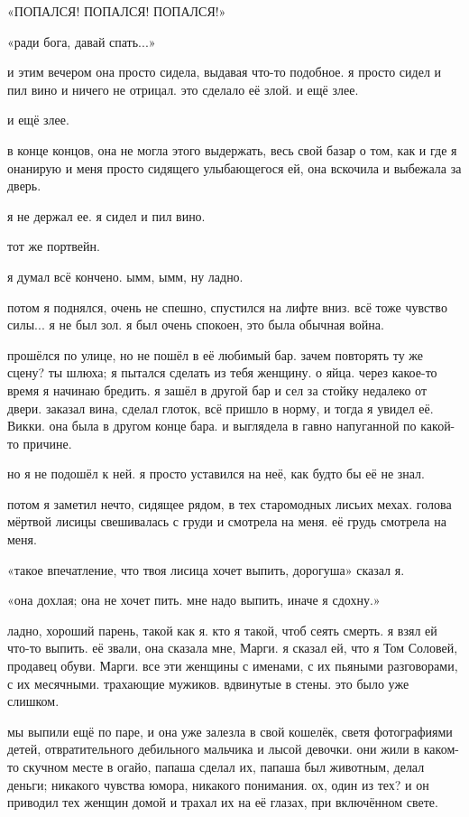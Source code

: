 «ПОПАЛСЯ! ПОПАЛСЯ! ПОПАЛСЯ!»

«ради бога, давай спать...»

и этим вечером она просто сидела, выдавая что-то подобное.
я просто сидел и
пил вино и ничего не отрицал.
это сделало её злой.
и ещё злее.

и ещё злее.

в конце концов, она не могла этого выдержать, весь свой базар о том, как и 
где я онанирую и меня просто сидящего улыбающегося ей, она вскочила и 
выбежала за дверь.

я не держал ее.
я сидел и пил вино.

тот же портвейн.

я думал всё кончено.
ымм, ымм, ну ладно.

потом я поднялся, очень не спешно, спустился на лифте вниз.
всё тоже чувство силы...
я не был зол.
я был очень спокоен, это была обычная война.

прошёлся по улице, но не пошёл в её любимый бар.
зачем повторять ту же 
сцену? ты шлюха; я пытался сделать из тебя женщину.
о яйца.
через какое-то
время я начинаю бредить.
я зашёл в другой бар и сел за стойку недалеко от 
двери.
заказал вина, сделал глоток, всё пришло в норму, и тогда я увидел её.
Викки.
она была в другом конце бара.
и выглядела в гавно напуганной по какой-то причине.

но я не подошёл к ней.
я просто уставился на неё, как будто бы её не знал.

потом я заметил нечто, сидящее рядом, в тех старомодных лисьих мехах.
голова
мёртвой лисицы свешивалась с груди и смотрела на меня.
её грудь смотрела на 
меня.

«такое впечатление, что твоя лисица хочет выпить, дорогуша» сказал я.

«она дохлая; она не хочет пить.
мне надо выпить, иначе я сдохну.»

ладно, хороший парень, такой как я.
кто я такой, чтоб сеять смерть.
я взял 
ей что-то выпить.
её звали, она сказала мне, Марги.
я сказал ей, что я Том 
Соловей, продавец обуви.
Марги.
все эти женщины с именами, с их пьяными 
разговорами, с их месячными.
трахающие мужиков.
вдвинутые в стены.
это было 
уже слишком.

мы выпили ещё по паре, и она уже залезла в свой кошелёк, светя фотографиями детей, отвратительного дебильного мальчика и лысой девочки.
они жили в 
каком-то скучном месте в огайо, папаша сделал их, папаша был животным, делал 
деньги; никакого чувства юмора, никакого понимания.
ох, один из тех? и он 
приводил тех женщин домой и трахал их на её глазах, при включённом свете.

